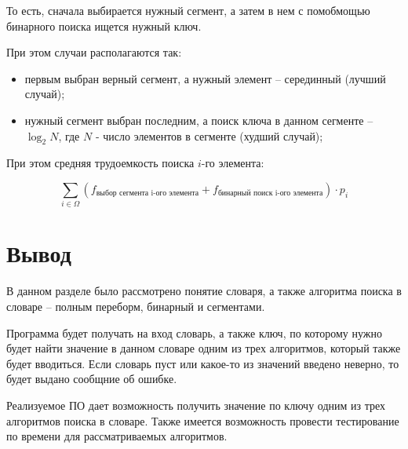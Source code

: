 То есть, сначала выбирается нужный сегмент, а затем в нем с помобмощью бинарного поиска ищется нужный ключ.


При этом случаи располагаются так:
\begin{itemize}
	\item первым выбран верный сегмент, а нужный элемент -- серединный (лучший случай);
	\item нужный сегмент выбран последним, а поиск ключа в данном сегменте -- $\log_2 N$, где $N$ - число элементов в сегменте (худший случай);
\end{itemize}


При этом средняя трудоемкость поиска $i$-го элемента:

\begin{equation}
	\sum_{i \in \Omega}{\left(f_{\text{выбор сегмента i-ого элемента}} + f_{\text{бинарный поиск i-ого элемента}}\right)} \cdot p_i
\end{equation}



\section{Вывод}

В данном разделе было рассмотрено понятие словаря, а также алгоритма поиска в словаре -- полным переборм, бинарный и сегментами.

Программа будет получать на вход словарь, а также ключ, по которому нужно будет найти значение в данном словаре одним из трех алгоритмов, который также будет вводиться. Если словарь пуст или какое-то из значений введено неверно, то будет выдано сообщние об ошибке.

Реализуемое ПО дает возможность получить значение по ключу одним из трех алгоритмов поиска в словаре. Также имеется возможность провести тестирование по времени для рассматриваемых алгоритмов.
